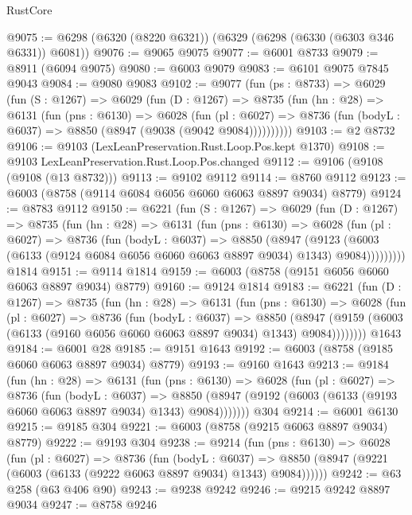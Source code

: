 \begin{lexlean}{RustCore}
\begin{coremodule}
@9075 := @6298 (@6320 (@8220 @6321)) (@6329 (@6298 (@6330 (@6303 @346 @6331)) @6081))
@9076 := @9065 @9075
@9077 := @6001 @8733
@9079 := @8911 (@6094 @9075)
@9080 := @6003 @9079
@9083 := @6101 @9075 @7845 @9043
@9084 := @9080 @9083
@9102 := @9077
    (fun (ps : @8733) =>
    @6029
      (fun (S : @1267) =>
      @6029
        (fun (D : @1267) =>
        @8735
          (fun (hn : @28) =>
          @6131
            (fun (pns : @6130) =>
            @6028
              (fun (pl : @6027) =>
              @8736 (fun (bodyL : @6037) => @8850 (@8947 (@9038 (@9042 @9084))))))))))
@9103 := @2 @8732
@9106 := @9103 (LexLeanPreservation.Rust.Loop.Pos.kept @1370)
@9108 := @9103 LexLeanPreservation.Rust.Loop.Pos.changed
@9112 := @9106 (@9108 (@9108 (@13 @8732)))
@9113 := @9102 @9112
@9114 := @8760 @9112
@9123 := @6003 (@8758 (@9114 @6084 @6056 @6060 @6063 @8897 @9034) @8779)
@9124 := @8783 @9112
@9150 := @6221
    (fun (S : @1267) =>
    @6029
      (fun (D : @1267) =>
      @8735
        (fun (hn : @28) =>
        @6131
          (fun (pns : @6130) =>
          @6028
            (fun (pl : @6027) =>
            @8736
              (fun (bodyL : @6037) =>
              @8850
                (@8947
                  (@9123
                    (@6003 (@6133 (@9124 @6084 @6056 @6060 @6063 @8897 @9034) @1343) @9084)))))))))
    @1814
@9151 := @9114 @1814
@9159 := @6003 (@8758 (@9151 @6056 @6060 @6063 @8897 @9034) @8779)
@9160 := @9124 @1814
@9183 := @6221
    (fun (D : @1267) =>
    @8735
      (fun (hn : @28) =>
      @6131
        (fun (pns : @6130) =>
        @6028
          (fun (pl : @6027) =>
          @8736
            (fun (bodyL : @6037) =>
            @8850
              (@8947 (@9159 (@6003 (@6133 (@9160 @6056 @6060 @6063 @8897 @9034) @1343) @9084))))))))
    @1643
@9184 := @6001 @28
@9185 := @9151 @1643
@9192 := @6003 (@8758 (@9185 @6060 @6063 @8897 @9034) @8779)
@9193 := @9160 @1643
@9213 := @9184
    (fun (hn : @28) =>
    @6131
      (fun (pns : @6130) =>
      @6028
        (fun (pl : @6027) =>
        @8736
          (fun (bodyL : @6037) =>
          @8850 (@8947 (@9192 (@6003 (@6133 (@9193 @6060 @6063 @8897 @9034) @1343) @9084)))))))
    @304
@9214 := @6001 @6130
@9215 := @9185 @304
@9221 := @6003 (@8758 (@9215 @6063 @8897 @9034) @8779)
@9222 := @9193 @304
@9238 := @9214
    (fun (pns : @6130) =>
    @6028
      (fun (pl : @6027) =>
      @8736
        (fun (bodyL : @6037) =>
        @8850 (@8947 (@9221 (@6003 (@6133 (@9222 @6063 @8897 @9034) @1343) @9084))))))
@9242 := @63 @258 (@63 @406 @90)
@9243 := @9238 @9242
@9246 := @9215 @9242 @8897 @9034
@9247 := @8758 @9246

\end{coremodule}
\end{lexlean}
